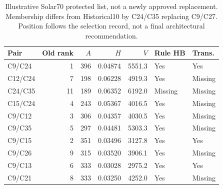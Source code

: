 \begin{table}[tbp]\centering\small\caption{Illustrative Solar70 protected list, not a newly approved replacement. Membership differs from Historical10 by C24/C35 replacing C9/C27. Position follows the selection record, not a final architectural recommendation.}\label{tab:shortlist}
\begin{tabular}{lrrrrll}\toprule
Pair & Old rank & $A$ & $H$ & $V$ & Rule HB & Trans.\\\midrule
C9/C24 & 1 & 396 & 0.04874 & 5551.3 & Yes & Yes\\
C12/C24 & 7 & 198 & 0.06228 & 4919.3 & Yes & Missing\\
C24/C35 & 11 & 189 & 0.06352 & 6192.0 & Missing & Missing\\
C15/C24 & 4 & 243 & 0.05367 & 4016.5 & Yes & Missing\\
C9/C12 & 3 & 306 & 0.04357 & 4030.5 & Yes & Missing\\
C9/C35 & 5 & 297 & 0.04481 & 5303.3 & Yes & Missing\\
C9/C15 & 2 & 351 & 0.03496 & 3127.8 & Yes & Yes\\
C9/C26 & 9 & 315 & 0.03520 & 3906.1 & Yes & Missing\\
C9/C13 & 6 & 333 & 0.03028 & 2975.2 & Yes & Yes\\
C9/C21 & 8 & 333 & 0.03250 & 4252.0 & Yes & Missing\\
\bottomrule\end{tabular}\end{table}
